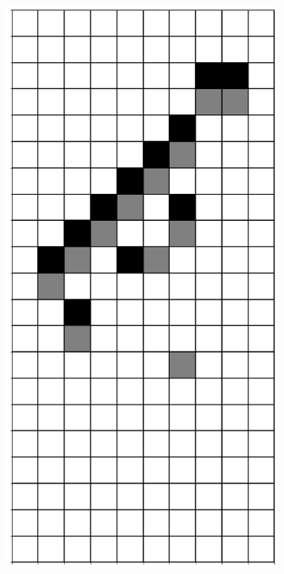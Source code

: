 \documentclass[12pt]{article}
\numberwithin{figure}{section} %
\begin{document}
\begin{figure}[H]
\begin{subfigure}{0.3\textwidth}
     \subcaption{}
   \end{subfigure}
     \begin{subfigure}{0.3\textwidth}
     \centering
     \includegraphics[angle=270,width=\linewidth]{Section4/23.7}

\end{subfigure}
\end{figure}
\end{document}
